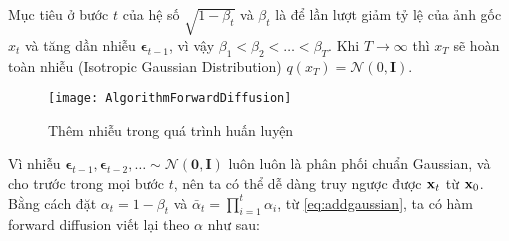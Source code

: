 Mục tiêu ở bước $t$ của hệ số $\sqrt{1 - \beta_t}$ và $\beta_t$ là để lần lượt giảm tỷ lệ của ảnh gốc $x_t$ và tăng dần nhiễu  $\boldsymbol{\epsilon}_{t-1}$, vì vậy $\beta_1 < \beta_2 < \dots < \beta_T$. Khi $T \to \infty$ thì $x_{T}$ sẽ hoàn toàn nhiễu \cite{weng2021diffusion} (Isotropic Gaussian Distribution) $q(x_{T}) = \mathcal{N} (0, \mathbf{I})$.

\begin{figure}[H]
	\centering
	\texttt{[image: AlgorithmForwardDiffusion]}
	\caption{Thêm nhiễu trong quá trình huấn luyện}
	\label{fig:AlgorithmForwardDiffusion}
\end{figure}

Vì nhiễu $\boldsymbol{\epsilon}_{t-1}, \boldsymbol{\epsilon}_{t-2}, \dots \sim \mathcal{N}(\mathbf{0}, \mathbf{I})$ luôn luôn là phân phối chuẩn Gaussian, và cho trước trong mọi bước $t$, nên ta có thể dễ dàng truy ngược được $\mathbf{x}_t$ từ $\mathbf{x}_0$. Bằng cách đặt $\alpha_t = 1 - \beta_t$ và $\bar{\alpha}_t = \prod_{i=1}^t \alpha_i$, từ \autoref{eq:addgaussian}, ta có hàm forward diffusion viết lại theo $\alpha$ như sau:



